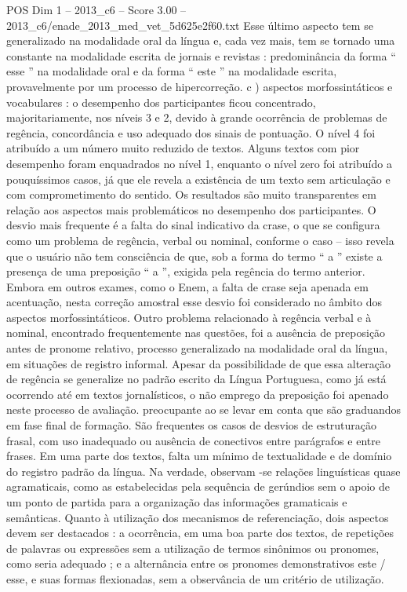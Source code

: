 \begin{textsample}{POS Dim 1 – 2013\_c6 – Score 3.00 – 2013\_c6/enade\_2013\_med\_vet\_5d625e2f60.txt}
Esse último aspecto tem se generalizado na modalidade oral da língua e, cada vez mais, tem se tornado uma constante na modalidade escrita de jornais e revistas : predominância da forma “ esse ” na modalidade oral e da forma “ este ” na modalidade escrita, provavelmente por um processo de hipercorreção. c ) aspectos morfossintáticos e vocabulares : o desempenho dos participantes ficou concentrado, majoritariamente, nos níveis 3 e 2, devido à grande ocorrência de problemas de regência, concordância e uso adequado dos sinais de pontuação.
O nível 4 foi atribuído a um número muito reduzido de textos.
Alguns textos com pior desempenho foram enquadrados no nível 1, enquanto o nível zero foi atribuído a pouquíssimos casos, já que ele revela a existência de um texto sem articulação e com comprometimento do sentido.
Os resultados são muito transparentes em relação aos aspectos mais problemáticos no desempenho dos participantes.
O desvio mais frequente é a falta do sinal indicativo da crase, o que se configura como um problema de regência, verbal ou nominal, conforme o caso – isso revela que o usuário não tem consciência de que, sob a forma do termo “ a ” existe a presença de uma preposição “ a ”, exigida pela regência do termo anterior.
Embora em outros exames, como o Enem, a falta de crase seja apenada em acentuação, nesta correção amostral esse desvio foi considerado no âmbito dos aspectos morfossintáticos.
Outro problema relacionado à regência verbal e à nominal, encontrado frequentemente nas questões, foi a ausência de preposição antes de pronome relativo, processo generalizado na modalidade oral da língua, em situações de registro informal.
Apesar da possibilidade de que essa alteração de regência se generalize no padrão escrito da Língua Portuguesa, como já está ocorrendo até em textos jornalísticos, o não emprego da preposição foi apenado neste processo de avaliação. preocupante ao se levar em conta que são graduandos em fase final de formação.
São frequentes os casos de desvios de estruturação frasal, com uso inadequado ou ausência de conectivos entre parágrafos e entre frases.
Em uma parte dos textos, falta um mínimo de textualidade e de domínio do registro padrão da língua.
Na verdade, observam -se relações linguísticas quase agramaticais, como as estabelecidas pela sequência de gerúndios sem o apoio de um ponto de partida para a organização das informações gramaticais e semânticas.
Quanto à utilização dos mecanismos de referenciação, dois aspectos devem ser destacados : a ocorrência, em uma boa parte dos textos, de repetições de palavras ou expressões sem a utilização de termos sinônimos ou pronomes, como seria adequado ; e a alternância entre os pronomes demonstrativos este / esse, e suas formas flexionadas, sem a observância de um critério de utilização.

\end{textsample}
